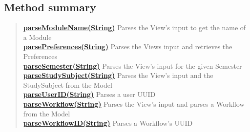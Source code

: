 \documentclass[11pt,a4paper]{report}
\begin{document}
{{{{{{{			\subsection{Method summary}{
				\begin{verse}
					\hyperlink{studyplanning.controller.InputParser.parseModuleName(java.lang.String)}{{\bf parseModuleName(String)}} Parses the View's input to get the name of a Module \\
					\hyperlink{studyplanning.controller.InputParser.parsePreferences(java.lang.String)}{{\bf parsePreferences(String)}} Parses the Views input and retrieves the Preferences\\
					\hyperlink{studyplanning.controller.InputParser.parseSemester(java.lang.String)}{{\bf parseSemester(String)}} Parses the View's input for the given Semester\\
					\hyperlink{studyplanning.controller.InputParser.parseStudySubject(java.lang.String)}{{\bf parseStudySubject(String)}} Parses the View's input and the StudySubject from the Model\\
					\hyperlink{studyplanning.controller.InputParser.parseUserID(java.lang.String)}{{\bf parseUserID(String)}} Parses a user UUID \\
					\hyperlink{studyplanning.controller.InputParser.parseWorkflow(java.lang.String)}{{\bf parseWorkflow(String)}} Parses the View's input and parses a Workflow from the Model\\
					\hyperlink{studyplanning.controller.InputParser.parseWorkflowID(java.lang.String)}{{\bf parseWorkflowID(String)}} Parses a Workflow's UUID\\
				\end{verse}
			}
			
}}}}}}}
\end{document}
